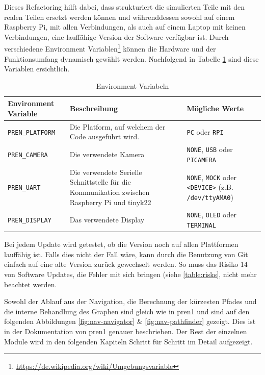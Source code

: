 Dieses Refactoring hilft dabei, dass strukturiert die simulierten Teile mit den realen Teilen ersetzt werden können und währenddessen sowohl auf einem Raspberry Pi, mit allen Verbindungen, als auch auf einem Laptop mit keinen Verbindungen, eine lauffähige Version der Software verfügbar ist.
Durch verschiedene Environment Variablen\footnote{\url{https://de.wikipedia.org/wiki/Umgebungsvariable}} können die Hardware und der Funktionsumfang dynamisch gewählt werden. Nachfolgend in Tabelle \ref{table:environment-variables} sind diese Variablen ersichtlich.


\begin{table}[H]
    \centering
    \begin{tabularx}{\textwidth}{|X|X|X|}
    \hline
        \textbf{Environment Variable} & \textbf{Beschreibung} & \textbf{Mögliche Werte}\\
        \hline
         \verb|PREN_PLATFORM| & Die Platform, auf welchem der Code ausgeführt wird. & \verb|PC| oder \verb|RPI| \\
         \hline
         \verb|PREN_CAMERA| & Die verwendete Kamera & \verb|NONE|, \verb|USB| oder \verb|PICAMERA| \\
         \hline
         \verb|PREN_UART| & Die verwendete Serielle Schnittstelle für die Kommunikation zwischen Raspberry Pi und \gls{tinyk22} & \verb|NONE|, \verb|MOCK| oder \verb|<DEVICE>| \newline (z.B. \verb|/dev/ttyAMA0|) \\
         \hline
         \verb|PREN_DISPLAY| & Das verwendete Display &  \verb|NONE|, \verb|OLED| oder \verb|TERMINAL|  \\
         \hline
    \end{tabularx}
    \caption{Environment Variabeln}
    \label{table:environment-variables}
\end{table}

Bei jedem Update wird getestet, ob die Version noch auf allen Plattformen lauffähig ist. Falls dies nicht der Fall wäre, kann durch die Benutzung von Git einfach auf eine alte Version zurück gewechselt werden. So muss das Risiko 14 von Software Updates, die Fehler mit sich bringen (siehe \ref{table:risks}, nicht mehr beachtet werden.

Sowohl der Ablauf aus der Navigation, die Berechnung der kürzesten Pfades und die interne Behandlung des Graphen sind gleich wie in \acrshort{pren1} und sind auf den folgenden Abbildungen \ref{fig:nav-navigator} \& \ref{fig:nav-pathfinder} gezeigt. Dies ist in der Dokumentation von \acrshort{pren1} genauer beschrieben. Der Rest der einzelnen Module wird in den folgenden Kapiteln Schritt für Schritt im Detail aufgezeigt.

